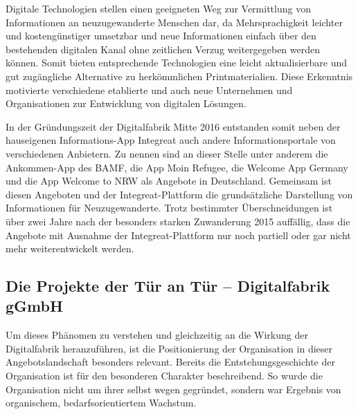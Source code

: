 \documentclass[12pt, a4paper]{article} %
\begin{document}
Digitale Technologien stellen einen geeigneten Weg zur Vermittlung von
Informationen an neuzugewanderte Menschen dar, da Mehrsprachigkeit
leichter und kostengünstiger umsetzbar und neue Informationen einfach
über den bestehenden digitalen Kanal ohne zeitlichen Verzug
weitergegeben werden können. Somit bieten entsprechende Technologien
eine leicht aktualisierbare und gut zugängliche Alternative zu
herkömmlichen Printmaterialien. Diese Erkenntnis motivierte verschiedene
etablierte und auch neue Unternehmen und Organisationen zur Entwicklung
von digitalen Lösungen.

In der Gründungszeit der Digitalfabrik Mitte 2016 entstanden somit neben
der hauseigenen Informations-App Integreat auch andere
Informationsportale von verschiedenen Anbietern. Zu nennen sind an
dieser Stelle unter anderem die Ankommen-App des BAMF, die App Moin
Refugee, die Welcome App Germany und die App Welcome to NRW als Angebote
in Deutschland. Gemeinsam ist diesen Angeboten und der
Integreat-Plattform die grundsätzliche Darstellung von Informationen für
Neuzugewanderte. Trotz bestimmter Überschneidungen ist über zwei Jahre
nach der besonders starken Zuwanderung 2015 auffällig, dass die Angebote
mit Ausnahme der Integreat-Plattform nur noch partiell oder gar nicht
mehr weiterentwickelt werden.

\hypertarget{die-projekte-der-tuxfcr-an-tuxfcr-digitalfabrik-ggmbh}{%
\subsection{Die Projekte der Tür an Tür – Digitalfabrik
gGmbH}\label{die-projekte-der-tuxfcr-an-tuxfcr-digitalfabrik-ggmbh}}

Um dieses Phänomen zu verstehen und gleichzeitig an die Wirkung der
Digitalfabrik heranzuführen, ist die Positionierung der Organisation in
dieser Angebotslandschaft besonders relevant. Bereits die
Entstehungsgeschichte der Organisation ist für den besonderen Charakter
beschreibend. So wurde die Organisation nicht um ihrer selbst wegen
gegründet, sondern war Ergebnis von organischem, bedarfsorientiertem
Wachstum.
\end{document}
